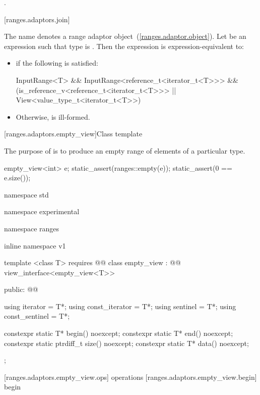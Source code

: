 \begin{itemdescr}
\pnum
\returns {}.
\end{itemdescr}

[ranges.adaptors.join]{}

\pnum
The name  denotes a range adaptor
object~(\ref{ranges.adaptor.object}). Let  be an expression such
that type  is . Then the expression
 is expression-equivalent to:

\begin{itemize}
\item {} if the following is satisfied:
\begin{codeblock}
InputRange<T> &&
InputRange<reference_t<iterator_t<T>>> &&
(is_reference_v<reference_t<iterator_t<T>>> ||
View<value_type_t<iterator_t<T>>)
\end{codeblock}
\item Otherwise,  is ill-formed.
\end{itemize}

[ranges.adaptors.empty_view]{Class template }

\pnum
The purpose of  is to produce an empty range of elements of
a particular type.

\pnum
\enterexample
\begin{codeblock}
empty_view<int> e;
static_assert(ranges::empty(e));
static_assert(0 == e.size());
\end{codeblock}
\exitexample

\begin{codeblock}
namespace std { namespace experimental { namespace ranges { inline namespace v1 {
  template <class T>
    requires @@
  class empty_view : @@ view_interface<empty_view<T>> {
  public:
    @@

    using iterator = T*;
    using const_iterator = T*;
    using sentinel = T*;
    using const_sentinel = T*;

    constexpr static T* begin() noexcept;
    constexpr static T* end() noexcept;
    constexpr static ptrdiff_t size() noexcept;
    constexpr static T* data() noexcept;
  };
}}}}
\end{codeblock}

[ranges.adaptors.empty_view.ops]{ operations}
[ranges.adaptors.empty_view.begin]{ begin}

